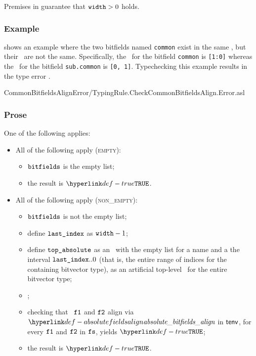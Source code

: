 Premises in  guarantee that $\texttt{width} > 0$ holds.

\subsubsection{Example}
 shows an example where the two bitfields named \texttt{common}
exist in the same \bitfieldscope, but their \absoluteslices\ are not the same.
Specifically, the \absoluteslice\ for the bitfield \texttt{common} is \texttt{[1:0]}
whereas the \absoluteslice\ for the bitfield \texttt{sub.common} is \texttt{[0, 1]}.
Typechecking this example results in the type error \BadSlices.

{CommonBitfieldsAlignError}{\typingtests/TypingRule.CheckCommonBitfieldsAlign.Error.asl}

\subsubsection{Prose}
One of the following applies:
\begin{itemize}
  \item All of the following apply (\textsc{empty}):
  \begin{itemize}
    \item $\vbitfields$ is the empty list;
    \item the result is $\True$.
  \end{itemize}

  \item All of the following apply (\textsc{non\_empty}):
  \begin{itemize}
    \item $\vbitfields$ is not the empty list;
    \item define $\texttt{last\_index}$ as $\texttt{width} - 1$;
    \item define $\vtopabsolute$ as an \absolutebitfield\ with the empty list
          for a name and a the interval $\texttt{last\_index}..0$ (that is, the entire range
          of indices for the containing bitvector type),
          as an artificial top-level \absolutebitfield\ for the entire bitvector type;
    \item \Prosebitfieldstoabsolute{$\tenv$}{$\vbitfields$}{$\vtopabsolute$}{$\vfs$};
    \item checking that \absolutebitfields\ $\texttt{f1}$ and $\texttt{f2}$ align via
          $\absolutebitfieldsalign$ in $\tenv$, for every $\texttt{f1}$ and $\texttt{f2}$ in $\vfs$,
          yields $\True$\ProseTerminateAs{\BadSlices};
    \item the result is $\True$.
  \end{itemize}
\end{itemize}

